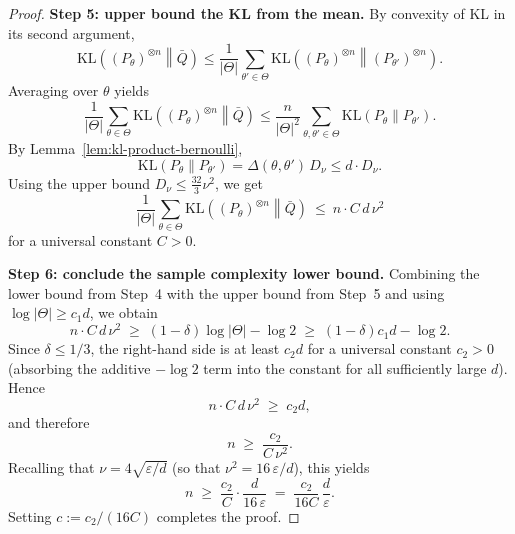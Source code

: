 \documentclass[10pt,a4paper]{amsart}
\newcommand{\KL}{\mathrm{KL}}
\newcommand{\eps}{\varepsilon}
\begin{document}
\begin{proof}
\medskip
\noindent\textbf{Step 5: upper bound the KL from the mean.}
By convexity of KL in its second argument,
\[
\KL\!\left((P_\theta)^{\otimes n}\middle\|\bar Q\right)
\le
\frac1{|\Theta|}\sum_{\theta'\in\Theta}
\KL\!\left((P_\theta)^{\otimes n}\middle\|(P_{\theta'})^{\otimes n}\right).
\]
Averaging over $\theta$ yields
\[
\frac1{|\Theta|}\sum_{\theta\in\Theta}
\KL\!\left((P_\theta)^{\otimes n}\middle\|\bar Q\right)
\le
\frac{n}{|\Theta|^2}\sum_{\theta,\theta'\in\Theta}
\KL(P_\theta\|P_{\theta'}).
\]
By Lemma~\ref{lem:kl-product-bernoulli},
\[
\KL(P_\theta\|P_{\theta'})
=\Delta(\theta,\theta')\,D_\nu
\le d\cdot D_\nu.
\]
Using the upper bound $D_\nu\le \frac{32}{3}\nu^2$, we get
\[
\frac1{|\Theta|}\sum_{\theta\in\Theta}
\KL\!\left((P_\theta)^{\otimes n}\middle\|\bar Q\right)
\ \le\ n\cdot C\,d\,\nu^2
\]
for a universal constant $C>0$.

\medskip
\noindent\textbf{Step 6: conclude the sample complexity lower bound.}
Combining the lower bound from Step~4 with the upper bound from Step~5 and using
$\log|\Theta|\ge c_1 d$, we obtain
\[
n\cdot C\,d\,\nu^2
\;\ge\;
(1-\delta)\log|\Theta|-\log 2
\;\ge\;
(1-\delta)c_1 d-\log 2 .
\]
Since $\delta\le 1/3$, the right-hand side is at least $c_2 d$ for a universal
constant $c_2>0$ (absorbing the additive $-\log 2$ term into the constant for
all sufficiently large $d$). Hence
\[
n\cdot C\,d\,\nu^2 \;\ge\; c_2 d,
\]
and therefore
\[
n
\;\ge\;
\frac{c_2}{C\,\nu^2}.
\]
Recalling that $\nu = 4\sqrt{\eps/d}$ (so that $\nu^2 = 16\,\eps/d$), this yields
\[
n
\;\ge\;
\frac{c_2}{C}\cdot \frac{d}{16\,\eps}
\;=\;
\frac{c_2}{16C}\,\frac{d}{\eps}.
\]
Setting $c:=c_2/(16C)$ completes the proof.
\end{proof}
\end{document}
